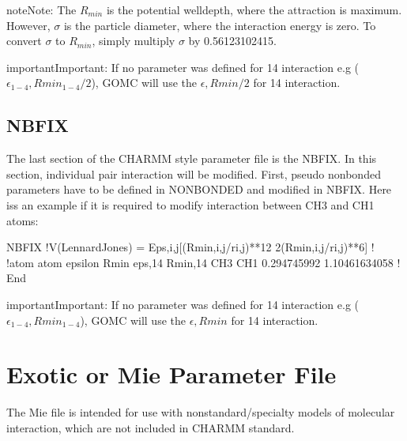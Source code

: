 \documentclass[letterpaper,10pt,english]{sphinxmanual}
\begin{document}
\begin{sphinxadmonition}{note}{Note:}
\sphinxAtStartPar
The \(R_{min}\) is the potential well\sphinxhyphen{}depth, where the attraction is maximum. However, \(\sigma\) is the particle diameter, where the interaction energy is zero. To convert \(\sigma\) to \(R_{min}\), simply multiply \(\sigma\) by 0.56123102415.
\end{sphinxadmonition}

\begin{sphinxadmonition}{important}{Important:}
\sphinxAtStartPar
If no parameter was defined for 1\sphinxhyphen{}4 interaction e.g (\(\epsilon_{1-4}, Rmin_{1-4}/2\)), GOMC will use the  \(\epsilon, Rmin/2\) for 1\sphinxhyphen{}4 interaction.
\end{sphinxadmonition}


\subsection{NBFIX}
\label{\detokenize{input_file:nbfix}}
\sphinxAtStartPar
The last section of the CHARMM style parameter file is the NBFIX. In this section, individual pair interaction will be modified. First, pseudo non\sphinxhyphen{}bonded parameters have to be defined in NONBONDED and modified in NBFIX. Here iss an example if it is required to modify interaction between CH3 and CH1 atoms:

\begin{sphinxVerbatim}[commandchars=\\\{\}]
NBFIX
!V(Lennard\PYGZhy{}Jones) = Eps,i,j[(Rmin,i,j/ri,j)**12 \PYGZhy{} 2(Rmin,i,j/ri,j)**6]
!
!atom atom  epsilon         Rmin          eps,1\PYGZhy{}4   Rmin,1\PYGZhy{}4
CH3   CH1   \PYGZhy{}0.294745992    1.10461634058 !
End
\end{sphinxVerbatim}

\begin{sphinxadmonition}{important}{Important:}
\sphinxAtStartPar
If no parameter was defined for 1\sphinxhyphen{}4 interaction e.g (\(\epsilon_{1-4}, Rmin_{1-4}\)), GOMC will use the  \(\epsilon, Rmin\) for 1\sphinxhyphen{}4 interaction.
\end{sphinxadmonition}


\section{Exotic or Mie Parameter File}
\label{\detokenize{input_file:exotic-or-mie-parameter-file}}
\sphinxAtStartPar
The Mie file is intended for use with nonstandard/specialty models of molecular interaction, which are not included in CHARMM standard.
\end{document}
